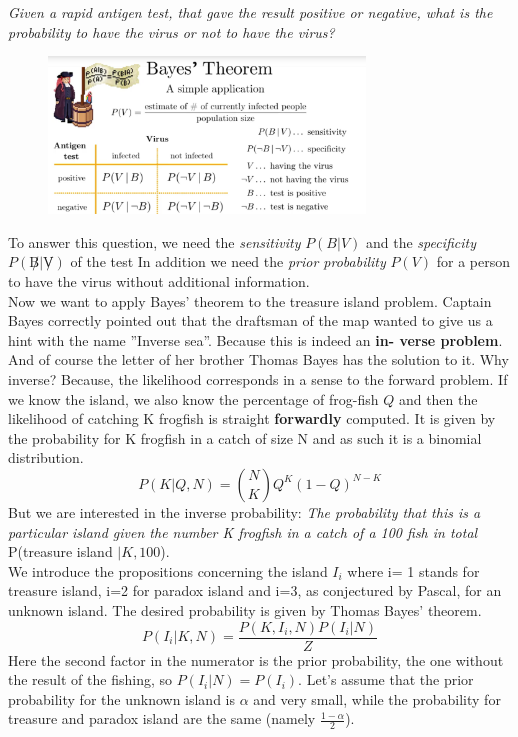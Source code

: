 \documentclass[12pt, a4paper]{scrartcl}
\begin{document}
\textit{Given a rapid antigen test, that gave the result positive or negative,
what is the probability to have the virus or not to have the virus?}
 \begin{figure}[H]
	\centering
	\includegraphics[width=0.75\textwidth]{6_1.png}
\end{figure}
To answer this question, we need the \textit{sensitivity} $P(B|V)$ and the \textit{speciﬁcity} $P(\not B|\not V)$ of the test
In addition we need the \textit{prior probability} $P(V)$ for a person to have the virus
without additional information.\\

Now we want to apply Bayes’ theorem to the treasure island problem. Captain Bayes 
correctly pointed out that the draftsman of the map wanted to
give us a hint with the name ”Inverse sea”. Because this is indeed an \textbf{in-
verse problem}. And of course the letter of her brother Thomas Bayes has
the solution to it.
Why inverse? Because, the likelihood corresponds in a sense to the forward
problem. If we know the island, we also know the percentage of frog-ﬁsh $Q$
and then the likelihood of catching K frogﬁsh is straight \textbf{forwardly}
computed. It is given by the probability for K frogﬁsh in a catch of size N
and as such it is a binomial distribution. \[P(K|Q,N)={N\choose K}Q^K(1-Q)^{N-K}\]
But we are interested in the inverse probability: \textit{The probability that this is
a particular island given the number K frogﬁsh in a catch of a 100 ﬁsh in
total} P(treasure island $|K, 100$).\\

We introduce the propositions concerning the island $I_i$ where i= 1 stands for
treasure island, i=2 for paradox island and i=3, as conjectured by Pascal,
for an unknown island. The desired probability is given by Thomas Bayes’
theorem. \[P(I_i|K,N)=\frac{P(K,I_i,N)P(I_i|N)}{Z}\]
Here the second factor in the numerator is the prior probability, the one without the result of the ﬁshing, so $P(I_i|N)=P(I_i)$.
Let’s assume that the prior probability for the unknown island is $\alpha$ and very
small, while the probability for treasure and paradox island are the same (namely $\frac{1-\alpha}{2}$).\\%
\end{document}
